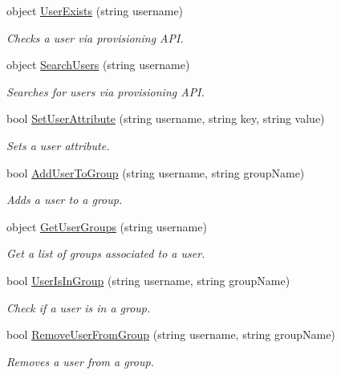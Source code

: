 \begin{DoxyCompactItemize}
object \hyperlink{classowncloudsharp_1_1_client_ac5c4564d7ef95b6fe8aa912f447e1644}{User\+Exists} (string username)
\begin{DoxyCompactList}\small\item\em Checks a user via provisioning A\+P\+I. \end{DoxyCompactList}\item 
object \hyperlink{classowncloudsharp_1_1_client_aa324d53147f5952788d983201fc7fcb7}{Search\+Users} (string username)
\begin{DoxyCompactList}\small\item\em Searches for users via provisioning A\+P\+I. \end{DoxyCompactList}\item 
bool \hyperlink{classowncloudsharp_1_1_client_a788f66e2d774a7c47e0a46918a50c5b5}{Set\+User\+Attribute} (string username, string key, string value)
\begin{DoxyCompactList}\small\item\em Sets a user attribute. \end{DoxyCompactList}\item 
bool \hyperlink{classowncloudsharp_1_1_client_a7b8657d971f2b1a9f27f2b8cfc73a21b}{Add\+User\+To\+Group} (string username, string group\+Name)
\begin{DoxyCompactList}\small\item\em Adds a user to a group. \end{DoxyCompactList}\item 
object \hyperlink{classowncloudsharp_1_1_client_a0ab2a296d77fa4def48b46a8d7b99da2}{Get\+User\+Groups} (string username)
\begin{DoxyCompactList}\small\item\em Get a list of groups associated to a user. \end{DoxyCompactList}\item 
bool \hyperlink{classowncloudsharp_1_1_client_a4c82896a96502650ab217cbf55342157}{User\+Is\+In\+Group} (string username, string group\+Name)
\begin{DoxyCompactList}\small\item\em Check if a user is in a group. \end{DoxyCompactList}\item 
bool \hyperlink{classowncloudsharp_1_1_client_a8c2bcb8ca08d661bb4c15b8cc07eaf5d}{Remove\+User\+From\+Group} (string username, string group\+Name)
\begin{DoxyCompactList}\small\item\em Removes a user from a group. \end{DoxyCompactList}\item 

\end{DoxyCompactItemize}
